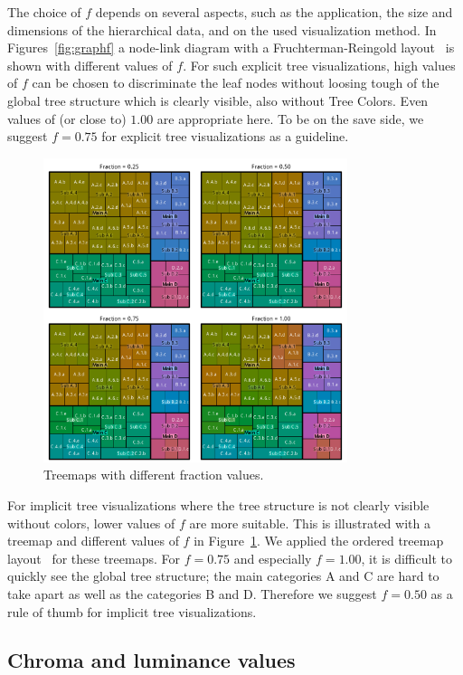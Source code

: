 \documentclass[review,journal]{vgtc}         %
\begin{document}
The choice of $f$ depends on several aspects, such as the application, the size and dimensions of the hierarchical data, and on the used visualization method. In Figures~\ref{fig:graphf} a node-link diagram with a Fruchterman-Reingold layout~\cite{Fruchterman91} is shown with different values of ${f}$. For such explicit tree visualizations, high values of ${f}$ can be chosen to discriminate the leaf nodes without loosing tough of the global tree structure which is clearly visible, also without Tree Colors. Even values of (or close to) $1.00$ are appropriate here. To be on the save side, we suggest $f=0.75$ for explicit tree visualizations as a guideline.

\begin{figure}[!b]
  \centering
  \includegraphics[width=3.5in]{Treemaps_hue.pdf}
  \caption{Treemaps with different fraction values.}\label{fig:treemapf}
\end{figure}


For implicit tree visualizations where the tree structure is not clearly visible without colors, lower values of $f$ are more suitable. This is illustrated with a treemap and different values of $f$ in Figure~\ref{fig:treemapf}. We applied the ordered treemap layout~\cite{Bederson2002} for these treemaps. For $f=0.75$ and especially $f=1.00$, it is difficult to quickly see the global tree structure; the main categories A and C are hard to take apart as well as the categories B and D. Therefore we suggest $f=0.50$ as a rule of thumb for implicit tree visualizations.

\subsection{Chroma and luminance values}
\end{document}
